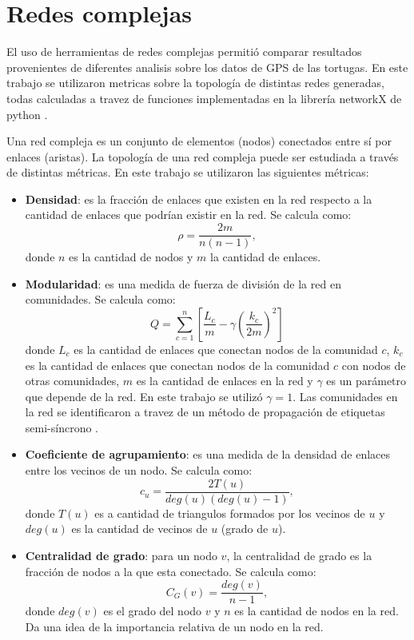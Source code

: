 \section{Redes complejas}
El uso de herramientas de redes complejas permitió comparar resultados provenientes de diferentes analisis sobre los datos de GPS de las tortugas. En este trabajo se utilizaron metricas sobre la topología de distintas redes generadas, todas calculadas a travez de funciones implementadas en la librería networkX de python \cite{networkx}. 

Una red compleja es un conjunto de elementos (nodos) conectados entre sí por enlaces (aristas). La topología de una red compleja puede ser estudiada a través de distintas métricas. En este trabajo se utilizaron las siguientes métricas:
\begin{itemize}
    \item \textbf{Densidad}: es la fracción de enlaces que existen en la red respecto a la cantidad de enlaces que podrían existir en la red. Se calcula como:
    \begin{equation}
        \rho = \frac{2m}{n(n-1)},
    \end{equation}
    donde $n$ es la cantidad de nodos y $m$ la cantidad de enlaces.
    \item  \textbf{Modularidad}: es una medida de fuerza de división de la red en comunidades. Se calcula como:
    \begin{equation}
        Q = \sum_{c=1}^{n}
        \left[ \frac{L_c}{m} - \gamma\left( \frac{k_c}{2m} \right) ^2 \right]
    \end{equation}
    donde $L_c$ es la cantidad de enlaces que conectan nodos de la comunidad $c$, $k_c$ es la cantidad de enlaces que conectan nodos de la comunidad $c$ con nodos de otras comunidades, $m$ es la cantidad de enlaces en la red y $\gamma$ es un parámetro que depende de la red. En este trabajo se utilizó $\gamma = 1$. Las comunidades en la red se identificaron a travez de un método de propagación de etiquetas semi-síncrono \cite{cordasco2010community}.
    \item \textbf{Coeficiente de agrupamiento}: es una medida de la densidad de enlaces entre los vecinos de un nodo. Se calcula como:
    \begin{equation}
        c_u = \frac{2 T(u)}{deg(u)(deg(u)-1)},
    \end{equation}
    donde $T(u)$ es a cantidad de triangulos formados por los vecinos de $u$ y $deg(u)$ es la cantidad de vecinos de $u$ (grado de $u$).

   \item \textbf{Centralidad de grado}: para un nodo $v$, la centralidad de grado es la fracción de nodos a la que esta conectado. Se calcula como:
    \begin{equation}
        C_G(v) = \frac{deg(v)}{n-1},
    \end{equation}
    donde $deg(v)$ es el grado del nodo $v$ y $n$ es la cantidad de nodos en la red. Da una idea de la importancia relativa de un nodo en la red. 
  
\end{itemize}

 
 
 
 

